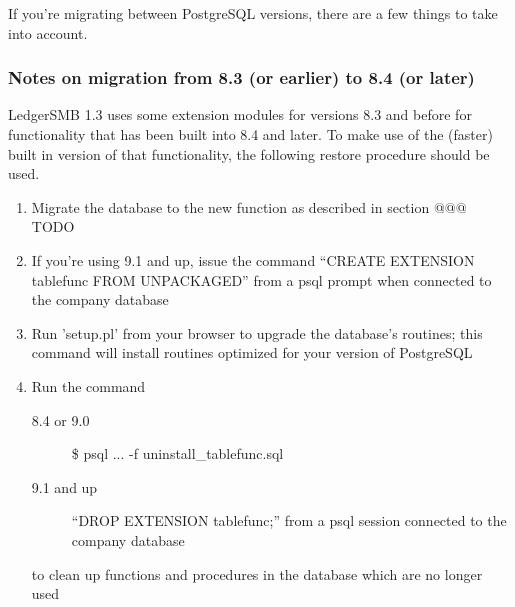 If you're migrating between PostgreSQL versions, there are a few things to take
into account.


\subsubsection{Notes on migration from 8.3 (or earlier) to 8.4 (or later)}
\label{subsec-migration-pre84-to84plus}



LedgerSMB 1.3 uses some extension modules for versions 8.3 and before for functionality
that has been built into 8.4 and later. To make use of the (faster) built in version
of that functionality, the following restore procedure should be used.

\begin{enumerate}
\item Migrate the database to the new function as described in section @@@ TODO
\item If you're using 9.1 and up, issue the command ``CREATE EXTENSION tablefunc FROM UNPACKAGED''
   from a psql prompt when connected to the company database
\item Run 'setup.pl' from your browser to upgrade the database's routines; this command will
   install routines optimized for your version of PostgreSQL
\item Run the command
        \begin{description}
        \item [8.4 or 9.0] \$ psql ... -f uninstall\_tablefunc.sql
        \item [9.1 and up] ``DROP EXTENSION tablefunc;'' from a psql session connected
                to the company database
        \end{description}
        to clean up functions and procedures in the database which are no longer used
\end{enumerate}


